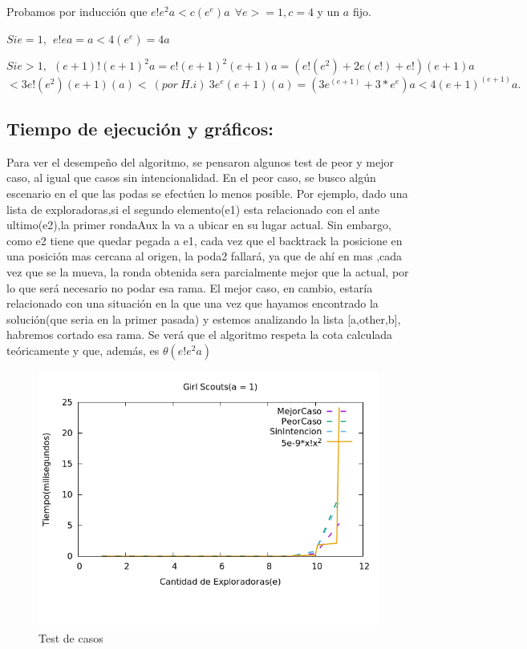 \documentclass[10pt, a4paper]{article}
\begin{document}
Probamos por inducción que $e!e^{2}a < c(e^e)a \ \ \forall e >=1 , c = 4 $ y un $a$ fijo.

$Si e = 1,\ \  e!ea = a < 4(e^{e})=4a$

$Si e > 1, \ \  (e+1)!(e+1)^{2}a = e!(e+1)^{2}(e+1)a = (e!(e^{2}) + 2e(e!) + e!)(e+1)a $\\

 $< 3e!(e^{2})(e+1)(a)<\ (por \  H.i) \ 3e^{e}(e+1)(a) = (3e^{(e+1)} + 3*e^{e})a < 4(e+1)^{(e+1)}a.$


\subsection{Tiempo de ejecución y gráficos:}

Para ver el desempeño del algoritmo, se pensaron algunos test de peor y mejor caso, al igual que casos sin intencionalidad. 
En el peor caso, se busco algún escenario en el que las podas se efectúen lo menos posible. Por ejemplo, dado una lista de exploradoras,si el segundo elemento(e1) esta relacionado con el ante ultimo(e2),la primer rondaAux la va a ubicar en su lugar actual. Sin embargo, como e2 tiene que quedar pegada a e1, cada vez que el backtrack la posicione en una posición mas cercana al origen, la poda2 fallará, ya que de ahí en mas ,cada vez que se la mueva, la ronda obtenida sera parcialmente mejor que la actual, por lo que será necesario no podar esa rama.
El mejor caso, en cambio, estaría relacionado con una situación en la que una vez que hayamos encontrado la solución(que seria en la primer pasada) y estemos analizando la lista [a,other,b], habremos cortado esa rama.
Se verá que el algoritmo respeta la cota calculada teóricamente y que, además, es $\theta(e!e^{2}a)$
		
\begin{figure}[H]
  		\centering
   	 	\includegraphics[width=1\textwidth]
   	 	{Imagenes/graph.png}
		\caption{Test de casos}
	\end{figure}		
\end{document}
